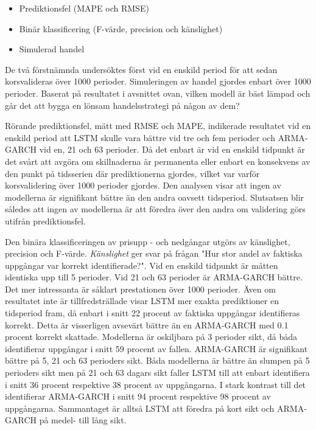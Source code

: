 \documentclass[11pt]{article}
\begin{document}
\begin{itemize}
    
\item Prediktionsfel (MAPE och RMSE)

\item Binär klassificering (F-värde, precision och känslighet)

\item Simulerad handel 
\end{itemize}

De två förstnämnda undersöktes först vid en enskild period för att sedan korsvalideras över 1000 perioder. Simuleringen av handel gjordes enbart över 1000 perioder. Baserat på resultatet i avsnittet ovan, vilken modell är bäst lämpad och går det att bygga en lönsam handelsstrategi på någon av dem?

Rörande prediktionsfel, mätt med RMSE och MAPE, indikerade resultatet vid en enskild period att LSTM skulle vara bättre vid tre och fem perioder och ARMA-GARCH vid en, 21 och 63 perioder. Då det enbart är vid en enskild tidpunkt är det svårt att avgöra om skillnaderna är permanenta eller enbart en konsekvens av den punkt på tidsserien där prediktionerna gjordes, vilket var varför korsvalidering över 1000 perioder gjordes. Den analysen visar att ingen av modellerna är signifikant bättre än den andra oavsett tidsperiod. Slutsatsen blir således att ingen av modellerna är att föredra över den andra om validering görs utifrån prediktionsfel. 

Den binära klassificeringen av prisupp - och nedgångar utgörs av känslighet, precision och F-värde. \textit{Känslighet} ger svar på frågan "Hur stor andel av faktiska uppgångar var korrekt identifierade?". Vid en enskild tidpunkt är måtten identiska upp till 5 perioder. Vid 21 och 63 perioder är ARMA-GARCH bättre. Det mer intressanta är såklart prestationen över 1000 perioder. Även om resultatet inte är tillfredsträllade visar LSTM mer exakta prediktioner en tidsperiod fram, då enbart i snitt 22 procent av faktiska uppgångar identifieras korrekt. Detta är visserligen avsevärt bättre än en ARMA-GARCH med 0.1 procent korrekt skattade. Modellerna är oskiljbara på 3 perioder sikt, då båda identifierar uppgångar i snitt 59 procent av fallen. ARMA-GARCH är signifikant bättre på 5, 21 och 63 perioders sikt. Båda modellerna är bättre än slumpen på 5 perioders sikt men på 21 och 63 dagars sikt faller LSTM till att enbart identifiera i snitt 36 procent respektive 38 procent av uppgångarna. I stark kontrast till det identifierar ARMA-GARCH i snitt 94 procent respektive 98 procent av uppgångarna. Sammantaget är alltså LSTM att föredra på kort sikt och ARMA-GARCH på medel- till lång sikt.
\end{document}
